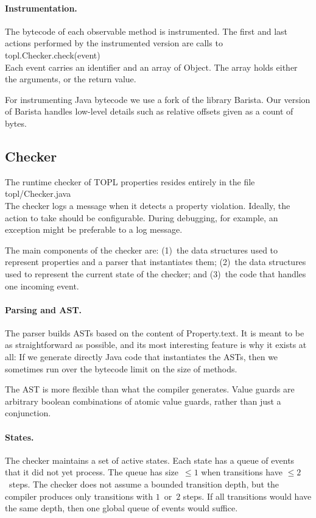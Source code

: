 \documentclass{article} %
\newcommand{\sfline}[1]{\\\hbox{\hspace{3em}\textsf{#1}}\\}
\begin{document}
\paragraph{Instrumentation.}
The bytecode of each observable method is instrumented.
The first and last actions performed by the instrumented version are calls to \sfline{topl.Checker.check(event)}
Each \textsf{event} carries an identifier and an array of \textsf{Object}.
The array holds either the arguments, or the return value.

For instrumenting Java bytecode we use a fork of the library Barista.
Our version of Barista handles low-level details such as relative offsets given as a count of bytes.

\subsection{Checker} %

The runtime checker of TOPL properties resides entirely in the file
\sfline{topl/Checker.java}
The checker logs a message when it detects a property violation.
Ideally, the action to take should be configurable.
During debugging, for example, an exception might be preferable to a log message.

The main components of the checker are: (1)~the data structures used to represent properties and a parser that instantiates them; (2)~the data structures used to represent the current state of the checker; and (3)~the code that handles one incoming event.

\paragraph{Parsing and AST\null.}
The parser builds ASTs based on the content of \textsf{Property.text}.
It is meant to be as straightforward as possible, and its most interesting feature is why it exists at all:
If we generate directly Java code that instantiates the ASTs, then we sometimes run over the bytecode limit on the size of methods.

The AST is more flexible than what the compiler generates.
Value guards are arbitrary boolean combinations of atomic value guards, rather than just a conjunction.

\paragraph{States.}
The checker maintains a set of active states.
Each state has a queue of events that it did not yet process.
The queue has size~$\le1$ when transitions have $\le2$~steps.
The checker does not assume a bounded transition depth, but the compiler produces only transitions with $1$~or~$2$ steps.
If all transitions would have the same depth, then one global queue of events would suffice.
\end{document}
